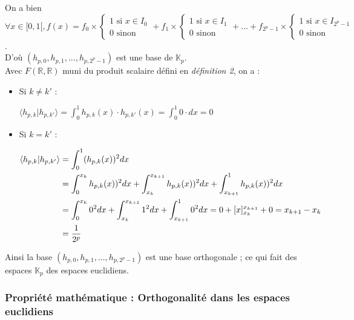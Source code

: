 \documentclass{article}
\begin{document}
On a bien $\forall x \in [0,1[, f(x) = f_0 \times \begin{cases} 1 \text{ si } x \in I_0 \\ 0 \text{ sinon } \end{cases}
+ f_1 \times \begin{cases} 1 \text{ si } x \in I_1 \\ 0 \text{ sinon } \end{cases}
+ ... +
f_{2^p - 1} \times \begin{cases} 1 \text{ si } x \in I_{2^p - 1} \\ 0 \text{ sinon } \end{cases} $.\\

D'où $(h_{p,0},h_{p,1},...,h_{p,2^p -1})$ est une base de $\mathbb{K}_p$.\\



Avec $F(\mathbb{R},\mathbb{R})$ muni du produit scalaire défini en \textit{définition 2}, on a : \\

\begin{itemize}

\item Si $k \neq k'$ :

$\displaystyle \langle h_{p,k}|h_{p,k'} \rangle = \int_{0}^{1} h_{p,k}(x)\cdot{}h_{p,k'}(x) = \int_0^1 0\cdot{}dx = 0$ \\

\item Si $k = k'$ :

\begin{align*} \displaystyle
\langle h_{p,k}|h_{p,k'} \rangle &= \int_{0}^{1} (h_{p,k}(x))^2 dx \\
 &= \int_{0}^{x_k} h_{p,k}(x))^2 dx + \int_{x_k}^{x_{k+1}} h_{p,k}(x))^2 dx + \int_{x_{k+1}}^{1} h_{p,k}(x))^2 dx  \\
\displaystyle &= \int_0^{x_k} 0^2 dx + \int_{x_k}^{x_{k+1}} 1^2 dx + \int_{x_{k+1}}^{1} 0^2 dx = 0 + [x]_{x_k}^{x_{k+1}} + 0 = x_{k+1} - x_k  \\
\displaystyle &= \frac{1}{2^p} \\
\end{align*} 
\end{itemize}

Ainsi la base $(h_{p,0},h_{p,1},...,h_{p,2^p -1})$ est une base orthogonale ; ce qui fait des espaces $\mathbb{K}_p$ des espaces euclidiens.


\subsubsection{Propriété mathématique : Orthogonalité dans les espaces euclidiens}
\end{document}

